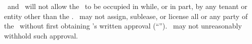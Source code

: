 \lessee\ and \lessor\ will not allow the \property\ to be occupied in while, or in part, by any tenant or entity other than the \lessee. \lessee\ may not assign, sublease, or license all or any party of the \property\ without first obtaining \lessor’s written approval (“\permittedtransfer”). \lessor\ may not unreasonably withhold such approval.
